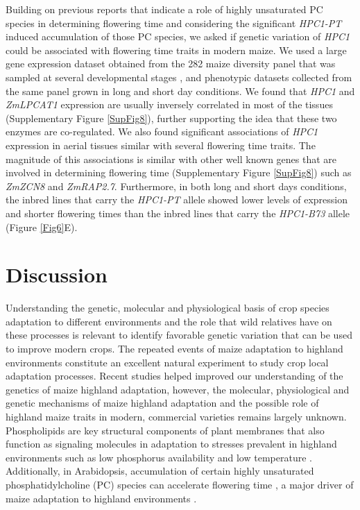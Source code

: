 \documentclass[9pt,twocolumn,twoside,lineno]{BioRxiv}
\begin{document}
Building on previous reports that indicate a role of highly unsaturated PC species in determining flowering time \cite{Nakamura2014-qf, Riedelsheimer2013-bd} and considering the significant \textit{HPC1-PT} induced accumulation of those PC species, we asked if genetic variation of \textit{HPC1} could be associated with flowering time traits in modern maize. 
We used a large gene expression dataset obtained from the 282 maize diversity panel that was sampled at several developmental stages \cite{Kremling2018-gn}, and phenotypic datasets collected from the same panel grown in long and short day conditions.
We found that \textit{HPC1} and \textit{ZmLPCAT1} expression are usually inversely correlated in most of the tissues (Supplementary Figure \ref{SupFig8}), further supporting the idea that these two enzymes are co-regulated. 
We also found significant associations of \textit{HPC1} expression in aerial tissues similar with several flowering time traits. 
The magnitude of this associations is similar with other well known genes that are involved in determining flowering time (Supplementary Figure \ref{SupFig8}) such as \textit{ZmZCN8}  and \textit{ZmRAP2.7}.  
Furthermore, in both long and short days conditions, the inbred lines that carry the \textit{HPC1-PT} allele showed lower levels of expression and shorter flowering times than the inbred lines that carry the \textit{HPC1-B73} allele  (Figure \ref{Fig6}E). 
 \section{Discussion}
\label{sec:discussion}
Understanding the genetic, molecular and  physiological basis of crop species adaptation to different environments and the role that wild relatives have on these processes is relevant to identify favorable genetic variation that can be used to improve modern crops.
The repeated events of maize adaptation to highland environments constitute an excellent natural experiment to study crop local adaptation processes. 
Recent studies \cite{Wang2020-mp, Takuno2015-uj, Crow2020-gene} helped improved our understanding of the genetics of maize highland adaptation, however, the molecular, physiological and genetic mechanisms of maize highland adaptation and the possible role of highland maize traits in modern, commercial varieties remains largely unknown.
Phospholipids are key structural components of plant membranes that also function as signaling molecules in adaptation to stresses prevalent in highland environments \cite{Ryu2004-iv, Nakamura2017-vb} such as low phosphorus availability \cite{Veneklaas2012-ls, Cruz-Ramirez2004-ib, Lambers2012-an} and low temperature \cite{Degenkolbe2012-wf, Welti2002-uk, Marla2017-ph}. 
Additionally, in Arabidopsis, accumulation of certain highly unsaturated phosphatidylcholine (PC) species can accelerate flowering time \cite{Nakamura2014-qf}, a major driver of maize adaptation to highland environments \cite{Romero_Navarro2017-cn, Gates2019-xu}.
 
\end{document}
